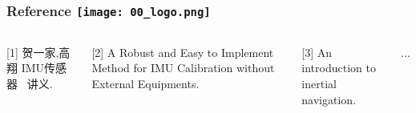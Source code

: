 \begin{comment}
\end{comment}
\begin{frame}
\frametitle{Reference \hfill \texttt{[image: 00\_logo.png]}}
\begin{columns}
  
	[1] 贺一家,高翔 IMU传感器 \ 讲义.

	[2] A Robust and Easy to Implement Method for IMU Calibration without External Equipments.

	[3] An introduction to inertial navigation.

	...
  
  

\end{columns}
\end{frame}

